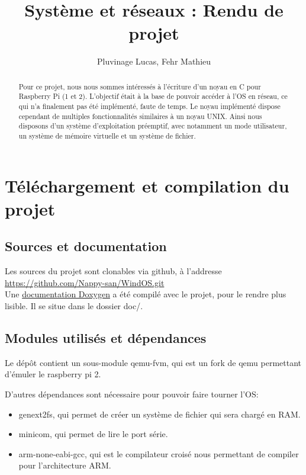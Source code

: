 \documentclass[a4paper]{article}
\author{Pluvinage Lucas, Fehr Mathieu}
\title{Système et réseaux : Rendu de projet}
\begin{document}
\maketitle

\begin{abstract}
  Pour ce projet, nous nous sommes intéressés à l'écriture d'un noyau en C pour
  Raspberry Pi (1 et 2). L'objectif était à la base de pouvoir accéder à l'OS en
  réseau, ce qui n'a finalement pas été implémenté, faute de temps. Le noyau
  implémenté dispose cependant de multiples fonctionnalités similaires à un noyau
  UNIX. Ainsi nous disposons d'un système d'exploitation préemptif, avec notamment
  un mode utilisateur, un système de mémoire virtuelle et un système de fichier.
\end{abstract}

\tableofcontents
\newpage

\section{Téléchargement et compilation du projet}
\subsection{Sources et documentation}

Les sources du projet sont clonables via github, à l'addresse
\href{https://github.com/Nappy-san/WindOS.git}{https://github.com/Nappy-san/WindOS.git}\\

Une \href{../doc/index.html}{documentation Doxygen} a été compilé avec le projet, pour le rendre plus
lisible. Il se situe dans le dossier doc/.

\subsection{Modules utilisés et dépendances}

Le dépôt contient un sous-module qemu-fvm, qui est un fork de qemu permettant d'émuler le raspberry pi 2.

D'autres dépendances sont nécessaire pour pouvoir faire tourner l'OS:
\begin{itemize}
\item genext2fs, qui permet de créer un système de fichier qui sera chargé en RAM.
\item minicom, qui permet de lire le port série.
\item arm-none-eabi-gcc, qui est le compilateur croisé nous permettant de compiler pour
l'architecture ARM.
\end{itemize}
\end{document}
